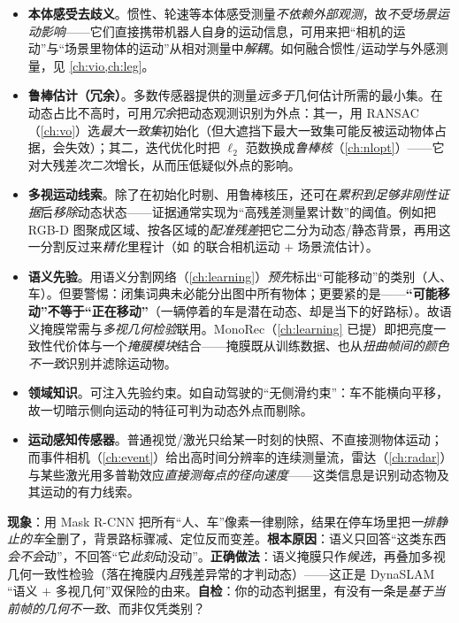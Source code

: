 \begin{itemize}
  \item \textbf{本体感受去歧义}。惯性、轮速等本体感受测量\emph{不依赖外部观测}，故\emph{不受场景运动影响}——它们直接携带机器人自身的运动信息，可用来把“相机的运动”与“场景里物体的运动”从相对测量中\emph{解耦}\cite{schmid2026dynamic}。如何融合惯性/运动学与外感测量，见 \cref{ch:vio,ch:leg}。
  \item \textbf{鲁棒估计（冗余）}。多数传感器提供的测量\emph{远多于}几何估计所需的最小集。在动态占比不高时，可用\emph{冗余}把动态观测识别为外点：其一，用 RANSAC（\cref{ch:vo}）选\emph{最大一致集}初始化（但大遮挡下最大一致集可能反被运动物体占据，会失效）；其二，迭代优化时把 $\ell_2$ 范数换成\emph{鲁棒核}（\cref{ch:nlopt}）——它对大残差\emph{次二次}增长，从而压低疑似外点的影响。
  \item \textbf{多视运动线索}。除了在初始化时剔、用鲁棒核压，还可在\emph{累积到足够非刚性证据}后\emph{移除}动态状态——证据通常实现为“高残差测量累计数”的阈值。例如把 RGB-D 图聚成区域、按各区域的\emph{配准残差}把它二分为动态/静态背景，再用这一分割反过来\emph{精化}里程计（如 \cite{jaimez2017fast} 的联合相机运动 $+$ 场景流估计）。
  \item \textbf{语义先验}。用语义分割网络（\cref{ch:learning}）\emph{预先}标出“可能移动”的类别（人、车）。但要警惕：闭集词典未必能分出图中所有物体；更要紧的是——\textbf{“可能移动”不等于“正在移动”}（一辆停着的车是潜在动态、却是当下的好路标）。故语义掩膜常需与\emph{多视几何检验}联用\cite{bescos2018dynaslam}。MonoRec\cite{wimbauer2021monorec}（\cref{ch:learning} 已提）即把亮度一致性代价体与一个\emph{掩膜模块}结合——掩膜既从训练数据、也从\emph{扭曲帧间的颜色不一致}识别并滤除运动物。
  \item \textbf{领域知识}。可注入先验约束。如自动驾驶的“无侧滑约束”：车不能横向平移，故一切暗示侧向运动的特征可判为动态外点而剔除。
  \item \textbf{运动感知传感器}。普通视觉/激光只给某一时刻的快照、不直接测物体运动；而事件相机（\cref{ch:event}）给出高时间分辨率的连续测量流，雷达（\cref{ch:radar}）与某些激光用多普勒效应\emph{直接测每点的径向速度}——这类信息是识别动态物及其运动的有力线索。
\end{itemize}

\begin{pitfall}
\textbf{现象}：用 Mask R-CNN 把所有“人、车”像素一律剔除，结果在停车场里把\emph{一排静止的车}全删了，背景路标骤减、定位反而变差。\textbf{根本原因}：语义只回答“这类东西\emph{会不会}动”，不回答“它\emph{此刻}动没动”。\textbf{正确做法}：语义掩膜只作\emph{候选}，再叠加多视几何一致性检验（落在掩膜内\emph{且}残差异常的才判动态）——这正是 DynaSLAM\cite{bescos2018dynaslam} “语义 $+$ 多视几何”双保险的由来。\textbf{自检}：你的动态判据里，有没有一条是\emph{基于当前帧的几何不一致}、而非仅凭类别？
\end{pitfall}

